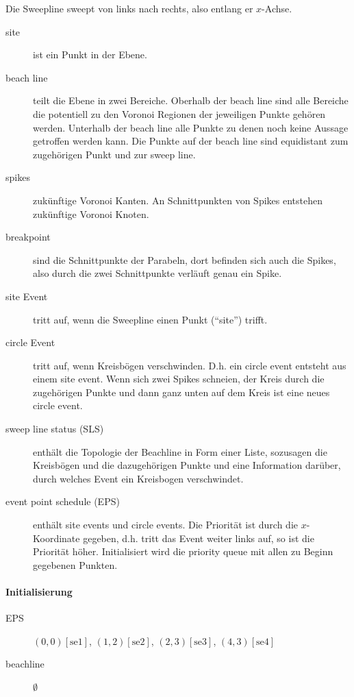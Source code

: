 Die Sweepline sweept von links nach rechts, also entlang er $x$-Achse.

\begin{description}
\item[site] ist ein Punkt in der Ebene.
\item[beach line] teilt die Ebene in zwei Bereiche. Oberhalb der beach line sind alle Bereiche die potentiell zu den Voronoi Regionen der jeweiligen Punkte gehören werden. Unterhalb der beach line alle Punkte zu denen noch keine Aussage getroffen werden kann. Die Punkte auf der beach line sind equidistant zum zugehörigen Punkt und zur sweep line.
\item[spikes] zukünftige Voronoi Kanten. An Schnittpunkten von Spikes entstehen zukünftige Voronoi Knoten.
\item[breakpoint] sind die Schnittpunkte der Parabeln, dort befinden sich auch die Spikes, also durch die zwei Schnittpunkte verläuft genau ein Spike.
\item[site Event] tritt auf, wenn die Sweepline einen Punkt ("`site"') trifft.
\item[circle Event] tritt auf, wenn Kreisbögen verschwinden. D.h. ein circle event entsteht aus einem site event. Wenn sich zwei Spikes schneien, der Kreis durch die zugehörigen Punkte und dann ganz unten auf dem Kreis ist eine neues circle event.
\item[sweep line status (SLS)] enthält die Topologie der Beachline in Form einer Liste, sozusagen die Kreisbögen und die dazugehörigen Punkte und eine Information darüber, durch welches Event ein Kreisbogen verschwindet.
\item[event point schedule (EPS)] enthält site events und circle events. Die Priorität ist durch die $x$-Koordinate gegeben, d.h. tritt das Event weiter links auf, so ist die Priorität höher. Initialisiert wird die priority queue mit allen zu Beginn gegebenen Punkten.
\end{description}

\paragraph*{Initialisierung}
\begin{description}
\item[EPS] $(0,0)[\text{se1}]$, $(1,2)[\text{se2}]$, $(2,3)[\text{se3}]$, $(4,3)[\text{se4}]$
\item[beachline] $\emptyset$
\end{description}

